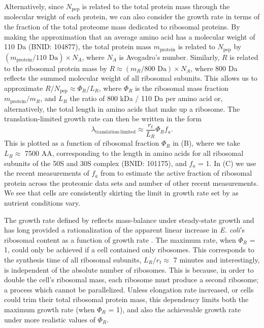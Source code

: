 Alternatively, since $N_\text{pep}$ is related to the total protein mass through
the molecular weight of each protein, we can also consider the growth rate in
terms of the fraction of the total proteome mass dedicated to ribosomal
proteins. By making the approximation that an average amino acid has a molecular
weight of 110 Da (BNID: 104877), the total protein mass $m_\text{protein}$
is related to $N_\text{pep}$ by $(m_\text{protein}/\text{110 Da}) \times N_A$,
where $N_A$ is Avogadro's number. Similarly, $R$ is related to the ribosomal
protein mass by $R \approx (m_R/\text{800 Da}) \times N_A$, where 800 Da
reflects the summed molecular weight of all ribosomal subunits.  This allows us
to approximate  $R / N_\text{pep} \approx \Phi_R / L_R$,  where $\Phi_R$ is the
ribosomal mass fraction $m_\text{protein}/m_R$, and $L_R$ the ratio of 800
kDa / 110 Da per amino acid or, alternatively, the total length in amino acids
that make up a ribosome. The translation-limited growth rate can then be written
in the form
\begin{equation}
\lambda_{\textrm{translation-limited}} \approx \frac{r_t}{L_R}  \Phi_R f_a.
\label{eq:translation_limit_growth_rate}
\end{equation}
This is plotted as a function of ribosomal fraction $\Phi_R$ in
(B), where we take $L_R \approx$ 7500 AA, corresponding to the
length in amino acids for all ribosomal subunits of the 50S and 30S complex
(BNID: 101175), and $f_a$ = 1. In (C) we use the
recent measurements of $f_a$ from \cite{dai2016} to estimate the active fraction of
ribosomal protein across the proteomic data sets and number of other recent
measurements. We see that cells are consistently skirting the limit in growth
rate set by  as nutrient conditions vary.

The growth rate defined by  reflects
mass-balance under steady-state growth and has long provided a rationalization
of the apparent linear increase in \textit{E. coli}'s ribosomal content as a
function of growth rate \citep{goldberger1979, scott2010}. The maximum rate,
when $\Phi_R$ = 1, could only be achieved if a cell contained only ribosomes.
This corresponds to the synthesis time of all ribosomal subunits, $L_R/ r_t
\approx$ 7 minutes \citep{dill2011} and interestingly, is independent of the
absolute number of ribosomes.  This is because, in order to double the cell's
ribosomal mass, each ribosome must produce a second ribosome; a process which
cannot be parallelized. Unless elongation rate increased, or cells could trim
their total ribosomal protein mass, this dependency limits both the maximum
growth rate (when $\Phi_R$ = 1), and also the achieveable growth rate under more
realistic values of $\Phi_R$.

